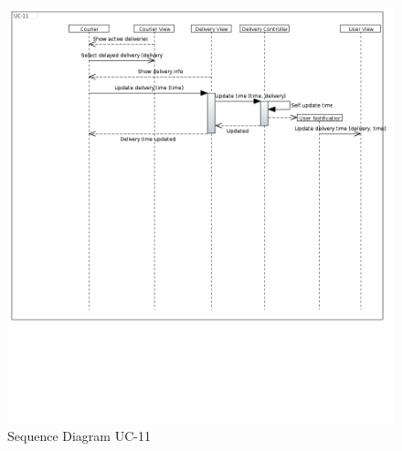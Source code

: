 \begin{figure}[h!]
\begin{center}
\includegraphics[scale=0.35]{FIGS/UC-112.PNG}
    \caption{Sequence Diagram UC-11}
    \label{fig:seq_diag11}
\end{center}
\end{figure}
